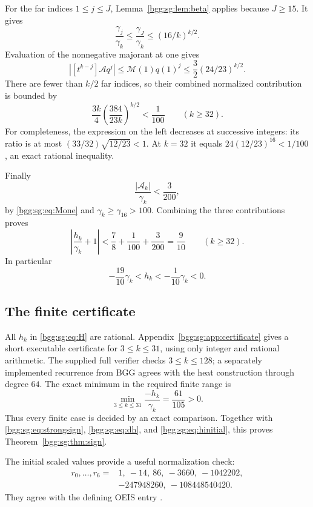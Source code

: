 \documentclass[11pt,a4paper]{article}
\numberwithin{equation}{section}
\theoremstyle{definition}
\theoremstyle{remark}
\theoremstyle{definition}
\begin{document}
For the far indices \(1\le j\le J\), Lemma~\ref{bgg:sg:lem:beta} applies
because \(J\ge15\).  It gives
\[
 \frac{\gamma_j}{\gamma_k}\le
 \frac{\gamma_J}{\gamma_k}\le(16/k)^{k/2}.
\]
Evaluation of the nonnegative majorant at one gives
\[
 |[t^{k-j}]\mathcal A q^j|
 \le \mathcal M(1)q(1)^j\le\frac32(24/23)^{k/2}.
\]
There are fewer than \(k/2\) far indices, so their combined
normalized contribution is bounded by
\begin{equation}\label{bgg:sg:eq:farbound}
 \frac{3k}{4}\left(\frac{384}{23k}\right)^{k/2}
 <\frac1{100}\qquad(k\ge32).
\end{equation}
For completeness, the expression on the left decreases at successive
integers: its ratio is at most
\((33/32)\sqrt{12/23}<1\).  At \(k=32\) it equals
\(24(12/23)^{16}<1/100\), an exact rational inequality.

Finally
\[
 \frac{|\mathcal A_k|}{\gamma_k}<\frac{3}{200},
\]
by \eqref{bgg:sg:eq:Mone} and \(\gamma_k\ge\gamma_{16}>100\).
Combining the three contributions proves
\begin{equation}\label{bgg:sg:eq:strongsign}
 \left|\frac{h_k}{\gamma_k}+1\right|
 <\frac78+\frac1{100}+\frac3{200}=\frac9{10}
 \qquad(k\ge32).
\end{equation}
In particular
\[
 -\frac{19}{10}\gamma_k<h_k<-\frac1{10}\gamma_k<0.
\]

\subsection{The finite certificate}

All \(h_k\) in \eqref{bgg:sg:eq:H} are rational.  Appendix~\ref{bgg:sg:app:certificate}
gives a short executable certificate for \(3\le k\le31\),
using only integer and rational arithmetic.  The supplied full verifier
checks \(3\le k\le128\); a separately implemented recurrence from
BGG agrees with the heat construction through degree \(64\).
The exact minimum in the required finite range is
\begin{equation}\label{bgg:sg:eq:finitemargin}
 \min_{3\le k\le31}\frac{-h_k}{\gamma_k}=\frac{61}{105}>0.
\end{equation}
Thus every finite case is decided by an exact comparison.
Together with \eqref{bgg:sg:eq:strongsign}, \eqref{bgg:sg:eq:dh}, and
\eqref{bgg:sg:eq:hinitial}, this proves Theorem~\ref{bgg:sg:thm:sign}.

The initial scaled values provide a useful normalization check:
\[
\begin{split}
 r_0,\ldots,r_6={}&1,\ -14,\ 86,\ -3660,\ -1042202,\\
 &-247948260,\ -108448540420.
\end{split}
\]
They agree with the defining OEIS entry \cite{oeis321941}.
\end{document}
